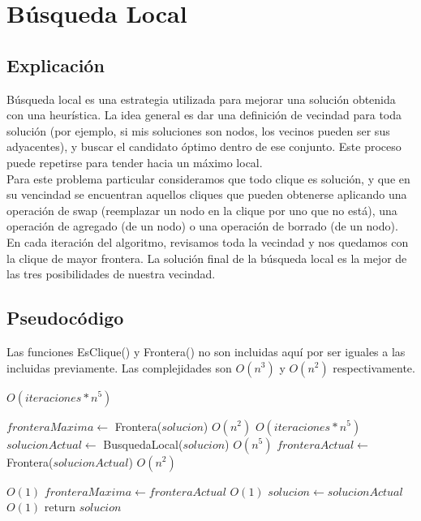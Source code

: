 \section{Búsqueda Local}

\subsection{Explicación}

Búsqueda local es una estrategia utilizada para mejorar una solución obtenida con una heurística. La idea general es dar una definición de vecindad para toda solución (por ejemplo, si mis soluciones son nodos, los vecinos pueden ser sus adyacentes), y buscar el candidato óptimo dentro de ese conjunto. Este proceso puede repetirse para tender hacia un máximo local. \\

Para este problema particular consideramos que todo clique es solución, y que en su vencindad se encuentran aquellos cliques que pueden obtenerse aplicando una operación de swap (reemplazar un nodo en la clique por uno que no está), una operación de agregado (de un nodo) o una operación de borrado (de un nodo). En cada iteración del algoritmo, revisamos toda la vecindad y nos quedamos con la clique de mayor frontera. La solución final de la búsqueda local es la mejor de las tres posibilidades de nuestra vecindad. \\

\subsection{Pseudocódigo}

Las funciones EsClique() y Frontera() no son incluidas aquí por ser iguales a las incluidas previamente. Las complejidades son $O(n^3)$ y $O(n^2)$ respectivamente. \\

\begin{algorithm}[H]
\begin{algorithmic}
          \Comment $O(iteraciones * n^5)$

    \State $fronteraMaxima \gets$ Frontera($solucion$)                      \Comment $O(n^2)$
                                             \Comment $O(iteraciones * n^5)$
        \State $solucionActual \gets$ BusquedaLocal($solucion$)             \Comment $O(n^5)$
        \State $fronteraActual \gets$ Frontera($solucionActual$)            \Comment $O(n^2)$

                                      \Comment $O(1)$
            \State $fronteraMaxima \gets fronteraActual$                    \Comment $O(1)$
            \State $solucion \gets solucionActual$                          \Comment $O(1)$
        \EndIf
    \EndFor
    \State return $solucion$

\EndFunction
\end{algorithmic}
\end{algorithm}


